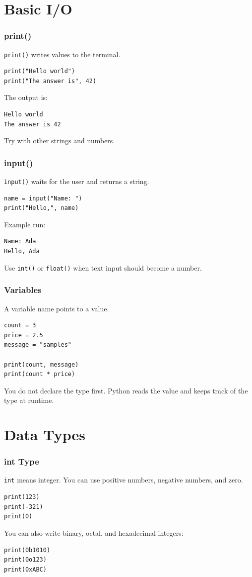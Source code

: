 \documentclass{beamer}
\begin{document}
	\section{Basic I/O}
	\begin{frame}[fragile]
		\frametitle{print()}

		\texttt{print()} writes values to the terminal.
		\begin{lstlisting}
print("Hello world")
print("The answer is", 42)
		\end{lstlisting}

		The output is:
		\begin{lstlisting}[style=shellstyle]
Hello world
The answer is 42
		\end{lstlisting}

		Try with other strings and numbers.
	\end{frame}

	\begin{frame}[fragile]
		\frametitle{input()}

		\texttt{input()} waits for the user and returns a string.
		\begin{lstlisting}
name = input("Name: ")
print("Hello,", name)
		\end{lstlisting}

		Example run:
		\begin{lstlisting}[style=shellstyle]
Name: Ada
Hello, Ada
		\end{lstlisting}

		Use \texttt{int()} or \texttt{float()} when text input should become a
		number.
	\end{frame}

	\begin{frame}[fragile]
		\frametitle{Variables}

		A variable name points to a value.
		\begin{lstlisting}
count = 3
price = 2.5
message = "samples"

print(count, message)
print(count * price)
		\end{lstlisting}

		You do not declare the type first. Python reads the value and keeps track
		of the type at runtime.
	\end{frame}

	\section{Data Types}
	\begin{frame}[fragile]
		\frametitle{int Type}

		\texttt{int} means integer. You can use positive numbers, negative
		numbers, and zero.
		\begin{lstlisting}
print(123)
print(-321)
print(0)
		\end{lstlisting}

		You can also write binary, octal, and hexadecimal integers:
		\begin{lstlisting}
print(0b1010)
print(0o123)
print(0xABC)
		\end{lstlisting}
	\end{frame}
\end{document}
